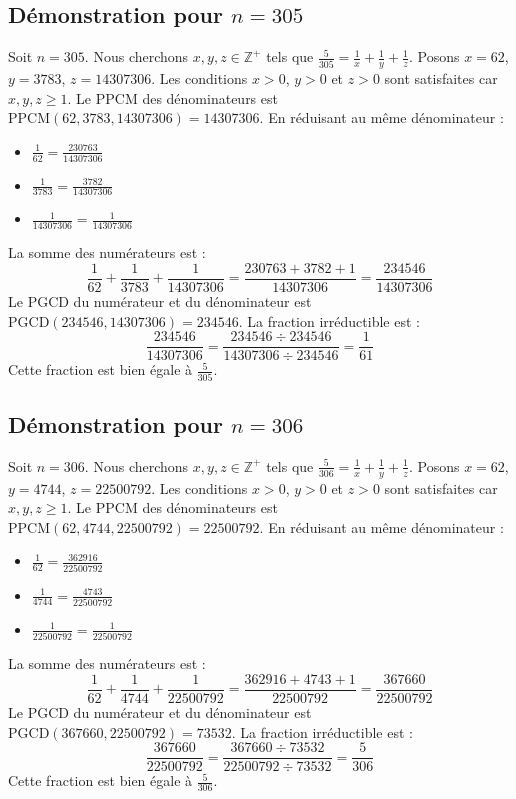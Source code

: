 \documentclass[11pt,a4paper]{article}
\begin{document}
\subsection{Démonstration pour $n = 305$}
Soit $n = 305$. Nous cherchons $x, y, z \in \mathbb{Z}^{+}$ tels que $\frac{5}{305} = \frac{1}{x} + \frac{1}{y} + \frac{1}{z}$.
Posons $x = 62$, $y = 3783$, $z = 14307306$.
Les conditions $x > 0$, $y > 0$ et $z > 0$ sont satisfaites car $x, y, z \geq 1$.
Le PPCM des dénominateurs est $\text{PPCM}(62, 3783, 14307306) = 14307306$.
En réduisant au même dénominateur :
\begin{itemize}
    \item $\frac{1}{62} = \frac{230763}{14307306}$
    \item $\frac{1}{3783} = \frac{3782}{14307306}$
    \item $\frac{1}{14307306} = \frac{1}{14307306}$
\end{itemize}
La somme des numérateurs est :
$$ \frac{1}{62} + \frac{1}{3783} + \frac{1}{14307306} = \frac{230763 + 3782 + 1}{14307306} = \frac{234546}{14307306} $$
Le PGCD du numérateur et du dénominateur est $\text{PGCD}(234546, 14307306) = 234546$.
La fraction irréductible est :
$$ \frac{234546}{14307306} = \frac{234546 \div 234546}{14307306 \div 234546} = \frac{1}{61} $$
Cette fraction est bien égale à $\frac{5}{305}$.

\subsection{Démonstration pour $n = 306$}
Soit $n = 306$. Nous cherchons $x, y, z \in \mathbb{Z}^{+}$ tels que $\frac{5}{306} = \frac{1}{x} + \frac{1}{y} + \frac{1}{z}$.
Posons $x = 62$, $y = 4744$, $z = 22500792$.
Les conditions $x > 0$, $y > 0$ et $z > 0$ sont satisfaites car $x, y, z \geq 1$.
Le PPCM des dénominateurs est $\text{PPCM}(62, 4744, 22500792) = 22500792$.
En réduisant au même dénominateur :
\begin{itemize}
    \item $\frac{1}{62} = \frac{362916}{22500792}$
    \item $\frac{1}{4744} = \frac{4743}{22500792}$
    \item $\frac{1}{22500792} = \frac{1}{22500792}$
\end{itemize}
La somme des numérateurs est :
$$ \frac{1}{62} + \frac{1}{4744} + \frac{1}{22500792} = \frac{362916 + 4743 + 1}{22500792} = \frac{367660}{22500792} $$
Le PGCD du numérateur et du dénominateur est $\text{PGCD}(367660, 22500792) = 73532$.
La fraction irréductible est :
$$ \frac{367660}{22500792} = \frac{367660 \div 73532}{22500792 \div 73532} = \frac{5}{306} $$
Cette fraction est bien égale à $\frac{5}{306}$.
\end{document}
